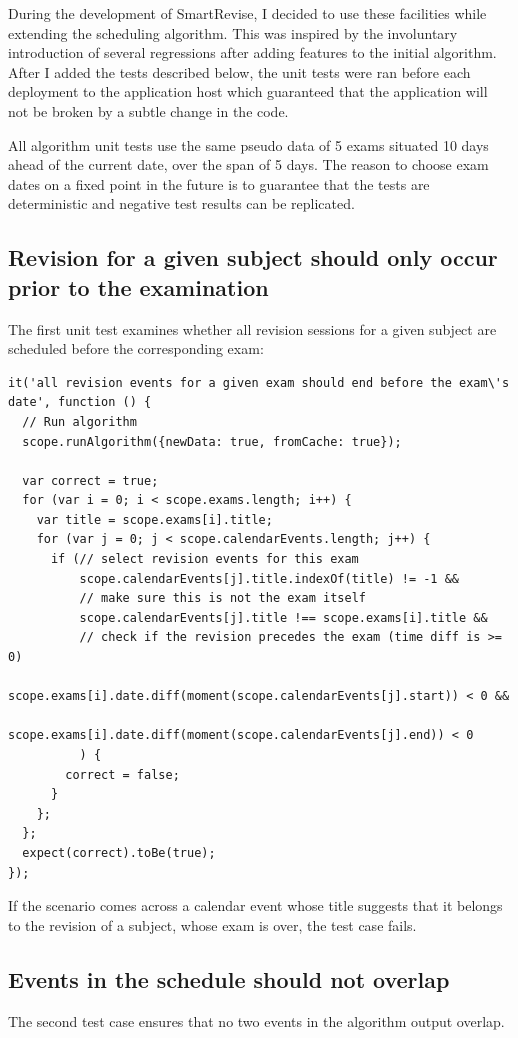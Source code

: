 \documentclass[bsc,frontabs,twoside,singlespacing,parskip]{infthesis}     %
\begin{document}
		During the development of SmartRevise, I decided to use these facilities while extending the scheduling algorithm. This was inspired by the involuntary introduction of several regressions after adding features to the initial algorithm. After I added the tests described below, the unit tests were ran before each deployment to the application host which guaranteed that the application will not be broken by a subtle change in the code.

		All algorithm unit tests use the same pseudo data of 5 exams situated 10 days ahead of the current date, over the span of 5 days. The reason to choose exam dates on a fixed point in the future is to guarantee that the tests are deterministic and negative test results can be replicated.

		\subsection{Revision for a given subject should only occur prior to the examination}
		The first unit test examines whether all revision sessions for a given subject are scheduled before the corresponding exam:

		\begin{lstlisting}
it('all revision events for a given exam should end before the exam\'s date', function () {
  // Run algorithm
  scope.runAlgorithm({newData: true, fromCache: true});

  var correct = true;
  for (var i = 0; i < scope.exams.length; i++) {
    var title = scope.exams[i].title;
    for (var j = 0; j < scope.calendarEvents.length; j++) {
      if (// select revision events for this exam
          scope.calendarEvents[j].title.indexOf(title) != -1 &&
          // make sure this is not the exam itself
          scope.calendarEvents[j].title !== scope.exams[i].title &&
          // check if the revision precedes the exam (time diff is >= 0)
          scope.exams[i].date.diff(moment(scope.calendarEvents[j].start)) < 0 &&
          scope.exams[i].date.diff(moment(scope.calendarEvents[j].end)) < 0
          ) {
        correct = false;
      }
    };
  };
  expect(correct).toBe(true);
});
		\end{lstlisting}

		If the scenario comes across a calendar event whose title suggests that it belongs to the revision of a subject, whose exam is over, the test case fails.

		\subsection{Events in the schedule should not overlap}
		The second test case ensures that no two events in the algorithm output overlap.
\end{document}

